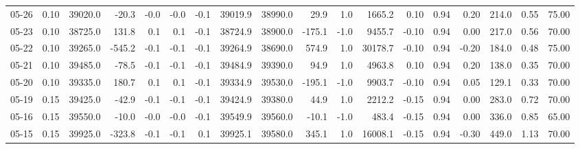 \begin{threeparttable}
{\begin{tabular}{lrrrrrrrrrrrrrrrrr}
  05-26 &     0.10 & 39020.0 &             -20.3 &              -0.0 &               -0.0 &               -0.1 & 39019.9 & 38990.0 &       29.9 &                      1.0 &              1665.2 &       0.10 &      0.94 &           0.20 &            214.0 &            0.55 &                  75.00 \\
  05-23 &     0.10 & 38725.0 &             131.8 &               0.1 &                0.1 &               -0.1 & 38724.9 & 38900.0 &     -175.1 &                     -1.0 &              9455.7 &      -0.10 &      0.94 &           0.00 &            217.0 &            0.56 &                  70.00 \\
  05-22 &     0.10 & 39265.0 &            -545.2 &              -0.1 &               -0.1 &               -0.1 & 39264.9 & 38690.0 &      574.9 &                      1.0 &             30178.7 &      -0.10 &      0.94 &          -0.20 &            184.0 &            0.48 &                  75.00 \\
  05-21 &     0.10 & 39485.0 &             -78.5 &              -0.1 &               -0.1 &               -0.1 & 39484.9 & 39390.0 &       94.9 &                      1.0 &              4963.8 &       0.10 &      0.94 &           0.20 &            138.0 &            0.35 &                  70.00 \\
  05-20 &     0.10 & 39335.0 &             180.7 &               0.1 &                0.1 &               -0.1 & 39334.9 & 39530.0 &     -195.1 &                     -1.0 &              9903.7 &      -0.10 &      0.94 &           0.05 &            129.1 &            0.33 &                  70.00 \\
  05-19 &     0.15 & 39425.0 &             -42.9 &              -0.1 &               -0.1 &               -0.1 & 39424.9 & 39380.0 &       44.9 &                      1.0 &              2212.2 &      -0.15 &      0.94 &           0.00 &            283.0 &            0.72 &                  70.00 \\
  05-16 &     0.15 & 39550.0 &             -10.0 &              -0.0 &               -0.0 &               -0.1 & 39549.9 & 39560.0 &      -10.1 &                     -1.0 &               483.4 &      -0.15 &      0.94 &           0.00 &            336.0 &            0.85 &                  65.00 \\
  05-15 &     0.15 & 39925.0 &            -323.8 &              -0.1 &               -0.1 &                0.1 & 39925.1 & 39580.0 &      345.1 &                      1.0 &             16008.1 &      -0.15 &      0.94 &          -0.30 &            449.0 &            1.13 &                  70.00 \\

\end{tabular}}
\end{threeparttable}
